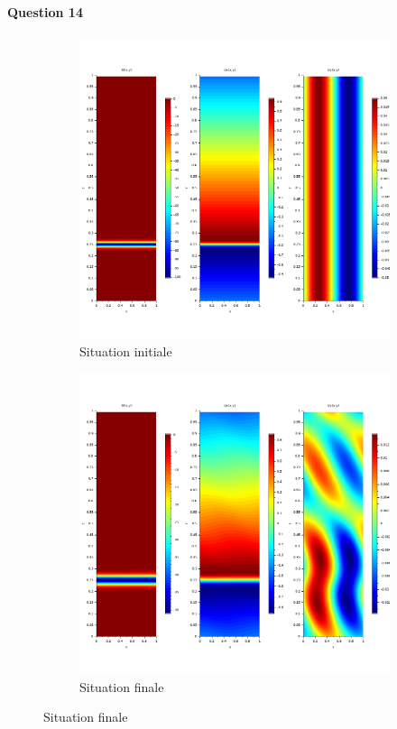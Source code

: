 \documentclass{article}
\begin{document}
\paragraph{Question 14}
\begin{figure}
	\centering
	\begin{subfigure}{0.3\textwidth}
		\includegraphics[width=\textwidth]{start_simu_2.png}
		\caption{Situation initiale}
	\end{subfigure}
	\begin{subfigure}{0.3\textwidth}
		\includegraphics[width=\textwidth]{end_simu_2.png}
		\caption{Situation finale}
	\end{subfigure}


\end{figure}
\end{document}
